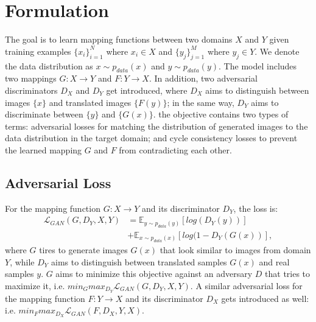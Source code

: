 \documentclass{scrartcl}
\begin{document}
\section*{Formulation}
The goal is to learn mapping functions between two domains $X$ and $Y$ given training examples $\{x_i\}_{i=1}^N$ where $x_i \in X$ and $\{y_j\}_{j=1}^M$ where $y_j \in Y$. We denote the data distribution as $x \sim p_{data}(x)$ and $y \sim p_{data}(y)$. The model includes two mappings $G: X \rightarrow Y$ and $F: Y \rightarrow X$. In addition, two adversarial discriminators $D_X$ and $D_Y$ get introduced, where $D_X$ aims to distinguish between images $\{x\}$ and translated images $\{F(y)\}$; in the same way, $D_Y$ aims to discriminate between $\{y\}$ and $\{G(x)\}$. the objective contains two types of terms: adversarial losses for matching the distribution of generated images to the data distribution in the target domain; and cycle consistency losses to prevent the learned mapping $G$ and $F$ from contradicting each other.

\subsection*{Adversarial Loss}
For the mapping function $G: X \rightarrow Y$ and its discriminator $D_Y$, the loss is:
\begin{equation}
\begin{split}
\mathcal{L}_{GAN}(G, D_Y, X, Y) &= \mathbb{E}_{y \sim p_{data}(y)} [log(D_Y(y))]\\
 &+ \mathbb{E}_{x \sim p_{data}(x)}[log(1 - D_Y(G(x))],
\end{split}
\end{equation}
where $G$ tires to generate images $G(x)$ that look similar to images from domain $Y$, while $D_Y$ aims to distinguish between translated samples $G(x)$ and real samples $y$. $G$ aims to minimize this objective against an adversary $D$ that tries to maximize it, i.e. $min_G max_{D_Y} \mathcal{L}_{GAN}(G, D_Y, X, Y)$. A similar adversarial loss for the mapping function $F: Y \rightarrow X$ and its discriminator $D_X$ gets introduced as well: i.e. $min_F max_{D_X} \mathcal{L}_{GAN} (F, D_X, Y, X)$.
\end{document}
